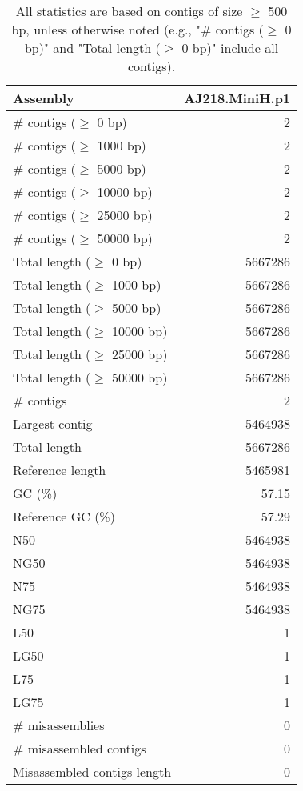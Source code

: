 \documentclass[12pt,a4paper]{article}
\begin{document}
\begin{table}[ht]
\begin{center}
\caption{All statistics are based on contigs of size $\geq$ 500 bp, unless otherwise noted (e.g., "\# contigs ($\geq$ 0 bp)" and "Total length ($\geq$ 0 bp)" include all contigs).}
\begin{tabular}{|l*{1}{|r}|}
\hline
Assembly & AJ218.MiniH.p1 \\ \hline
\# contigs ($\geq$ 0 bp) & 2 \\ \hline
\# contigs ($\geq$ 1000 bp) & 2 \\ \hline
\# contigs ($\geq$ 5000 bp) & 2 \\ \hline
\# contigs ($\geq$ 10000 bp) & 2 \\ \hline
\# contigs ($\geq$ 25000 bp) & 2 \\ \hline
\# contigs ($\geq$ 50000 bp) & 2 \\ \hline
Total length ($\geq$ 0 bp) & 5667286 \\ \hline
Total length ($\geq$ 1000 bp) & 5667286 \\ \hline
Total length ($\geq$ 5000 bp) & 5667286 \\ \hline
Total length ($\geq$ 10000 bp) & 5667286 \\ \hline
Total length ($\geq$ 25000 bp) & 5667286 \\ \hline
Total length ($\geq$ 50000 bp) & 5667286 \\ \hline
\# contigs & 2 \\ \hline
Largest contig & 5464938 \\ \hline
Total length & 5667286 \\ \hline
Reference length & 5465981 \\ \hline
GC (\%) & 57.15 \\ \hline
Reference GC (\%) & 57.29 \\ \hline
N50 & 5464938 \\ \hline
NG50 & 5464938 \\ \hline
N75 & 5464938 \\ \hline
NG75 & 5464938 \\ \hline
L50 & 1 \\ \hline
LG50 & 1 \\ \hline
L75 & 1 \\ \hline
LG75 & 1 \\ \hline
\# misassemblies & 0 \\ \hline
\# misassembled contigs & 0 \\ \hline
Misassembled contigs length & 0 \\ \hline

\end{tabular}
\end{center}
\end{table}
\end{document}
